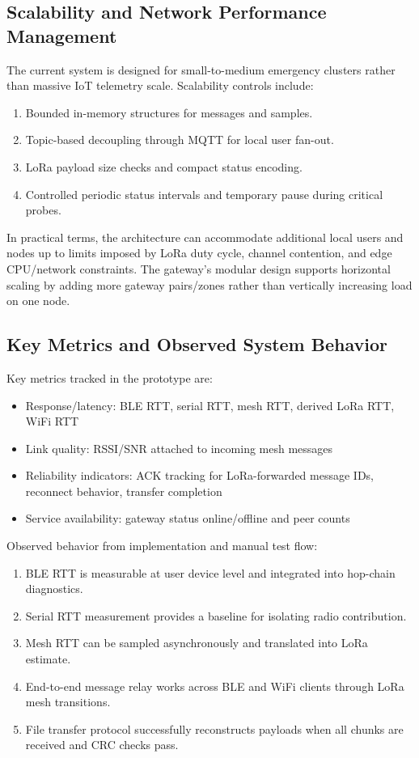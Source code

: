 \documentclass[conference]{IEEEtran}
\begin{document}
\subsection{Scalability and Network Performance Management}
The current system is designed for small-to-medium emergency clusters rather than massive IoT telemetry scale. Scalability controls include:
\begin{enumerate}
\item Bounded in-memory structures for messages and samples.
\item Topic-based decoupling through MQTT for local user fan-out.
\item LoRa payload size checks and compact status encoding.
\item Controlled periodic status intervals and temporary pause during critical probes.
\end{enumerate}

In practical terms, the architecture can accommodate additional local users and nodes up to limits imposed by LoRa duty cycle, channel contention, and edge CPU/network constraints. The gateway's modular design supports horizontal scaling by adding more gateway pairs/zones rather than vertically increasing load on one node.

\subsection{Key Metrics and Observed System Behavior}
Key metrics tracked in the prototype are:
\begin{itemize}
\item Response/latency: BLE RTT, serial RTT, mesh RTT, derived LoRa RTT, WiFi RTT
\item Link quality: RSSI/SNR attached to incoming mesh messages
\item Reliability indicators: ACK tracking for LoRa-forwarded message IDs, reconnect behavior, transfer completion
\item Service availability: gateway status online/offline and peer counts
\end{itemize}

Observed behavior from implementation and manual test flow:
\begin{enumerate}
\item BLE RTT is measurable at user device level and integrated into hop-chain diagnostics.
\item Serial RTT measurement provides a baseline for isolating radio contribution.
\item Mesh RTT can be sampled asynchronously and translated into LoRa estimate.
\item End-to-end message relay works across BLE and WiFi clients through LoRa mesh transitions.
\item File transfer protocol successfully reconstructs payloads when all chunks are received and CRC checks pass.
\end{enumerate}
\end{document}
